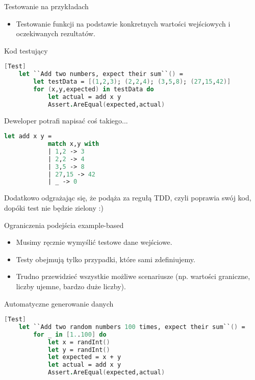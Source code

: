\begin{frame}{Testowanie na przykładach}
    \begin{itemize}
        \item Testowanie funkcji na podstawie konkretnych wartości wejściowych i oczekiwanych rezultatów.
    \end{itemize}
    \end{frame}
    
\begin{frame}[fragile]{Kod testujący}
    \begin{lstlisting}[language=FSharp, xleftmargin=-10pt,xrightmargin=-10pt,numbers=none]
    [Test]
    let ``Add two numbers, expect their sum``() =
        let testData = [(1,2,3); (2,2,4); (3,5,8); (27,15,42)]
        for (x,y,expected) in testData do
            let actual = add x y
            Assert.AreEqual(expected,actual)
    \end{lstlisting}
\end{frame}
    
\begin{frame}[fragile]{Deweloper potrafi napisać coś takiego...}
    \begin{lstlisting}[language=FSharp, xleftmargin=-10pt,xrightmargin=-10pt,numbers=none]
        let add x y =
            match x,y with
            | 1,2 -> 3
            | 2,2 -> 4
            | 3,5 -> 8
            | 27,15 -> 42
            | _ -> 0
    \end{lstlisting}
    Dodatkowo odgrażając się, że podąża za regułą TDD, czyli poprawia swój kod, dopóki test nie będzie zielony :)
\end{frame}
    
\begin{frame}{Ograniczenia podejścia example-based}
    \begin{itemize}
        \item Musimy ręcznie wymyślić testowe dane wejściowe.
        \item Testy obejmują tylko przypadki, które sami zdefiniujemy.
        \item Trudno przewidzieć wszystkie możliwe scenariusze (np. wartości graniczne, liczby ujemne, bardzo duże liczby).
    \end{itemize}
\end{frame}

\begin{frame}[fragile]{Automatyczne generowanie danych}
    \begin{lstlisting}[language=FSharp, xleftmargin=-20pt,xrightmargin=-10pt,numbers=none]
    [Test]
    let ``Add two random numbers 100 times, expect their sum``() =
        for _ in [1..100] do
            let x = randInt()
            let y = randInt()
            let expected = x + y
            let actual = add x y
            Assert.AreEqual(expected,actual)
    \end{lstlisting}
\end{frame}
    

